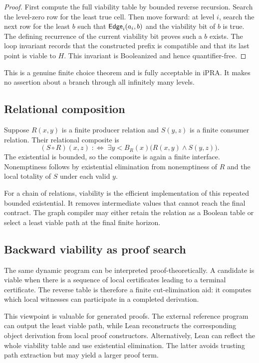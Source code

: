 \begin{proof}
First compute the full viability table by bounded reverse recursion.  Search the level-zero row for the least true cell.  Then move forward: at level \(i\), search the next row for the least \(b\) such that \(\mathsf{Edge}_i(a_i,b)\) and the viability bit of \(b\) is true.  The defining recurrence of the current viability bit proves such a \(b\) exists.  The loop invariant records that the constructed prefix is compatible and that its last point is viable to \(H\).  This invariant is Booleanized and hence quantifier-free.
\end{proof}

This is a genuine finite choice theorem and is fully acceptable in iPRA.  It makes no assertion about a branch through all infinitely many levels.

\subsection{Relational composition}

Suppose \(R(x,y)\) is a finite producer relation and \(S(y,z)\) is a finite consumer relation.  Their relational composite is
\[
 (S\circ R)(x,z)\;:\Longleftrightarrow\;
 \exists y<B_R(x)\bigl(R(x,y)\wedge S(y,z)\bigr).
\]
The existential is bounded, so the composite is again a finite interface.  Nonemptiness follows by existential elimination from nonemptiness of \(R\) and the local totality of \(S\) under each valid \(y\).

For a chain of relations, viability is the efficient implementation of this repeated bounded existential.  It removes intermediate values that cannot reach the final contract.  The graph compiler may either retain the relation as a Boolean table or select a least viable path at the final finite horizon.

\subsection{Backward viability as proof search}

The same dynamic program can be interpreted proof-theoretically.  A candidate is viable when there is a sequence of local certificates leading to a terminal certificate.  The reverse table is therefore a finite cut-elimination aid: it computes which local witnesses can participate in a completed derivation.

This viewpoint is valuable for generated proofs.  The external reference program can output the least viable path, while Lean reconstructs the corresponding object derivation from local proof constructors.  Alternatively, Lean can reflect the whole viability table and use existential elimination.  The latter avoids trusting path extraction but may yield a larger proof term.

